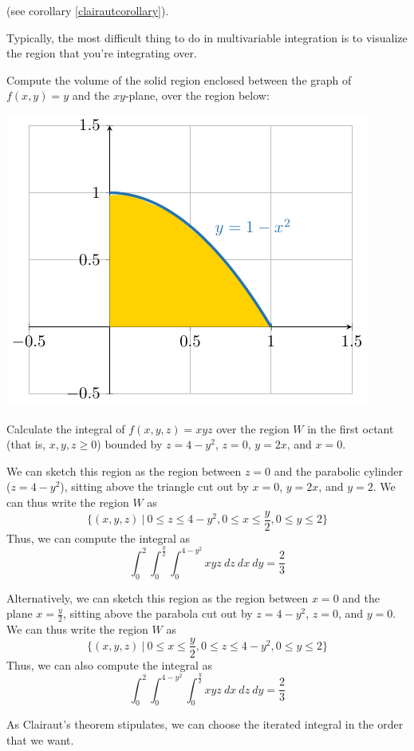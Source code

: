     \begin{remark}
         (see corollary \ref{clairautcorollary}).
    \end{remark}

    Typically, the most difficult thing to do in multivariable integration is to visualize the region that you're integrating over.  

    \begin{example}
        Compute the volume of the solid region enclosed between the graph of  $f(x,y) = y$ and the $xy$-plane, over the region below:

        \begin{example}
            \includegraphics[scale=.7]{chapters/4-IntegrationRn/figures/figures-1-xsquaredregion.pdf}
        \end{example}
        
    \end{example}

    \begin{example}
    Calculate the integral of $f(x,y,z) = xyz$ over the region $W$ in the first octant (that is, $x, y, z \geq 0$) bounded by $z = 4 - y^2$, $z = 0$, $y = 2x$, and $x= 0$.

    We can sketch this region as the region between $z=0$ and the parabolic cylinder ($z = 4 - y^2$), sitting above the triangle cut out by $x=0$, $y = 2x$, and $y=2$. We can thus write the region $W$ as 
    $$\{(x,y,z) \ | \ 0 \leq z \leq 4-y^2, 0 \leq x \leq \frac{y}{2}, 0 \leq y \leq 2\}$$
    Thus, we can compute the integral as $$\int_0^2\int_0^\frac{y}{2}\int_0^{4-y^2} xyz \ dz \ dx \ dy = \frac{2}{3}$$

    Alternatively, we can sketch this region as the region between $x=0$ and the plane $x = \frac{y}{2}$, sitting above the parabola cut out by $z = 4 - y^2$, $z=0$, and $y=0$.  We can thus write the region $W$ as 
    $$\{(x,y,z) \ | \ 0 \leq x \leq \frac{y}{2}, 0 \leq z \leq 4-y^2, 0 \leq y \leq 2\}$$
    Thus, we can also compute the integral as $$\int_0^2\int_0^{4-y^2}\int_0^\frac{y}{2} xyz \ dx \ dz \ dy = \frac{2}{3}$$

    As Clairaut's theorem stipulates, we can choose the iterated integral in the order that we want.
    \end{example}


